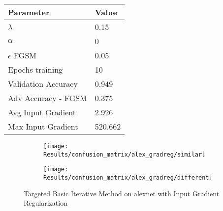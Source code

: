 \documentclass[draft,final]{vutinfth} %
\begin{document}
\begin{table}[h]
  \centering
  \begin{tabular}{ll}
    \toprule
			Parameter			& Value   \\
    \midrule
			$\lambda$								& 0.15		\\
			$\alpha$								& 0				\\
			$\epsilon$ FGSM					& 0.05		\\
			Epochs training					& 10			\\
			
			Validation Accuracy			& 0.949		\\
			Adv Accuracy - FGSM			& 0.375		\\
			
			Avg Input Gradient			& 2.926		\\
			Max Input Gradient			& 520.662 \\
    \bottomrule
  \end{tabular}
\end{table}


\begin{figure}[h]
  \begin{subfigure}[b]{0.5\columnwidth}
		\centering
    \texttt{[image: Results/confusion\_matrix/alex\_gradreg/similar]}%
    \label{fig:exp:cm:alex_gradreg:similar}
  \end{subfigure}
  \begin{subfigure}[b]{0.5\columnwidth}
		\centering
    \texttt{[image: Results/confusion\_matrix/alex\_gradreg/different]}
    \label{fig:exp:cm:alex_gradreg:different}
  \end{subfigure}
  \caption{Targeted Basic Iterative Method on alexnet with Input Gradient Regularization}
\end{figure}
\clearpage
\end{document}
